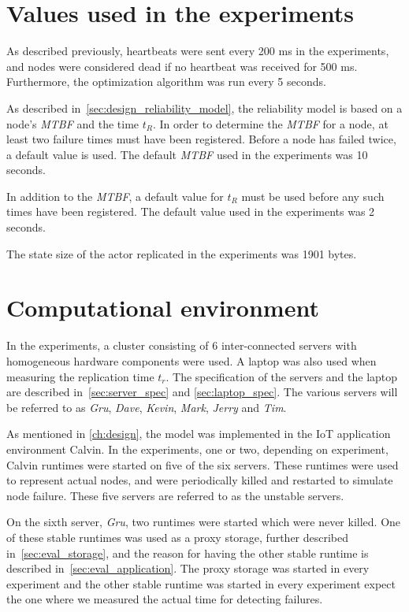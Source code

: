 \documentclass{cslthse-msc}
\begin{document}
\section{Values used in the experiments} \label{sec:eval_values}
As described previously, heartbeats were sent every 200 ms in the experiments, and nodes were considered dead if no heartbeat was received for 500 ms. Furthermore, the optimization algorithm was run every 5 seconds.

As described in~\cref{sec:design_reliability_model}, the reliability model is based on a node's \emph{MTBF} and the time $t_R$. In order to determine the \emph{MTBF} for a node, at least two failure times must have been registered. Before a node has failed twice, a default value is used. The default \emph{MTBF} used in the experiments was 10 seconds.

In addition to the \emph{MTBF}, a default value for $t_R$ must be used before any such times have been registered. The default value used in the experiments was 2 seconds.

The state size of the actor replicated in the experiments was 1901 bytes.

\section{Computational environment} \label{sec:eval_comp_env}
In the experiments, a cluster consisting of 6 inter-connected servers with homogeneous hardware components were used. A laptop was also used when measuring the replication time $t_r$. The specification of the servers and the laptop are described in~\cref{sec:server_spec} and \cref{sec:laptop_spec}. The various servers will be referred to as \emph{Gru}, \emph{Dave}, \emph{Kevin}, \emph{Mark}, \emph{Jerry} and \emph{Tim}.

As mentioned in \cref{ch:design}, the model was implemented in the IoT application environment Calvin. In the experiments, one or two, depending on experiment, Calvin runtimes were started on five of the six servers. These runtimes were used to represent actual nodes, and were periodically killed and restarted to simulate node failure. These five servers are referred to as the unstable servers.

On the sixth server, \emph{Gru}, two runtimes were started which were never killed. One of these stable runtimes was used as a proxy storage, further described in~\cref{sec:eval_storage}, and the reason for having the other stable runtime is described in~\cref{sec:eval_application}. The proxy storage was started in every experiment and the other stable runtime was started in every experiment expect the one where we measured the actual time for detecting failures.
\end{document}
